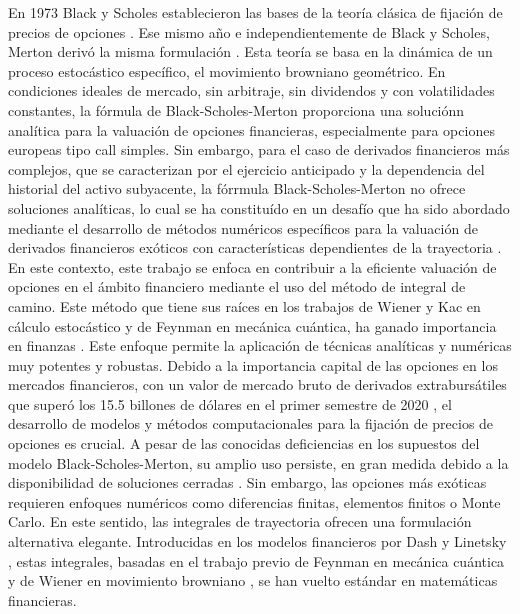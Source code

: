 \documentclass[11pt,a4paper]{article}
\begin{document}
En 1973 Black y Scholes establecieron las bases de la teor\'ia cl\'asica de fijaci\'on de precios de opciones \cite{black1973pricing}. Ese mismo a\~no e independientemente de Black y Scholes, Merton deriv\'o la misma formulaci\'on \cite{merton1973theory}. Esta teor\'ia se basa en la din\'amica de un proceso estoc\'astico espec\'ifico, el movimiento browniano geom\'etrico. En condiciones ideales de mercado, sin arbitraje, sin dividendos y con volatilidades constantes, la f\'ormula de Black-Scholes-Merton proporciona una soluci\'onn anal\'itica para la valuaci\'on de opciones financieras, especialmente para opciones europeas tipo call simples. Sin embargo, para el caso de derivados financieros m\'as complejos, que se caracterizan por el ejercicio anticipado y la dependencia del historial del activo subyacente, la f\'orrmula Black-Scholes-Merton no ofrece soluciones anal\'iticas, lo cual se ha constitu\'ido en un desaf\'io que ha sido abordado mediante el desarrollo de m\'etodos num\'ericos espec\'ificos para la valuaci\'on de derivados financieros ex\'oticos con caracter\'isticas dependientes de la trayectoria \cite{linetsky1997path, devreese2010path}.\\
En este contexto, este trabajo se enfoca en contribuir a la eficiente valuaci\'on de opciones en el \'ambito financiero mediante el uso del m\'etodo de integral de camino. Este m\'etodo que tiene sus ra\'ices en los trabajos de Wiener y Kac en cálculo estocástico y de Feynman en mecánica cuántica, ha ganado importancia en finanzas \cite{linetsky1997path, devreese2010path, montagna2002path, capuozzo2021path}. Este enfoque permite la aplicaci\'on de t\'ecnicas anal\'iticas y num\'ericas muy potentes y robustas. Debido a la importancia capital de las opciones en los mercados financieros, con un valor de mercado bruto de derivados extraburs\'atiles que super\'o los 15.5 billones de d\'olares en el primer semestre de 2020 \cite{capuozzo2021path}, el desarrollo de modelos y m\'etodos computacionales para la fijaci\'on de precios de opciones es crucial. A pesar de las conocidas deficiencias en los supuestos del modelo Black-Scholes-Merton, su amplio uso persiste, en gran medida debido a la disponibilidad de soluciones cerradas \cite{maurette2023quantderivados}. Sin embargo, las opciones m\'as exóticas requieren enfoques num\'ericos como diferencias finitas, elementos finitos o Monte Carlo. En este sentido, las integrales de trayectoria ofrecen una formulaci\'on alternativa elegante. Introducidas en los modelos financieros por Dash \cite{dash1989path} y Linetsky \cite{linetsky1997path}, estas integrales, basadas en el trabajo previo de Feynman en mecánica cuántica \cite{feynman2010quantum, sakurai1995modern, falomir2021integrales, schaposnik2014cuantica} y de Wiener en movimiento browniano \cite{wiener1921average}, se han vuelto estándar en matemáticas financieras.\\
\end{document}
